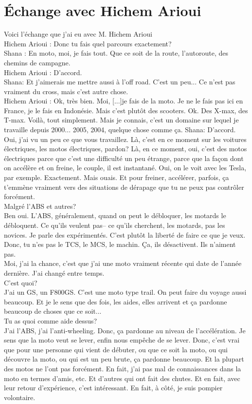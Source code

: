\section{Échange avec Hichem Arioui}
Voici l'échange que j'ai eu avec M. Hichem Arioui \\
Hichem Arioui : Donc tu fais quel parcours exactement? \\
Shana : En moto, moi, je fais tout. Que ce soit de la route, l'autoroute, des chemins de campagne.\\
Hichem Arioui : D'accord. \\
Shana: Et j'aimerais me mettre aussi à l'off road. C'est un peu... Ce n'est pas vraiment du cross, mais c'est autre chose. \\
Hichem Arioui : Ok, très bien. Moi, [...]je fais de la moto. Je ne le fais pas ici en France, je le fais en Indonésie. Mais c'est plutôt des scooters. Ok. Des X-max, des T-max. Voilà, tout simplement. Mais je connais, c'est un domaine sur lequel je travaille depuis 2000... 2005, 2004, quelque chose comme ça. 
Shana: D'accord. Oui, j'ai vu un peu ce que vous travaillez. Là, c'est en ce moment sur les voitures électriques, les motos électriques, pardon? Là, en ce moment, oui, c'est des motos électriques parce que c'est une difficulté un peu étrange, parce que la façon dont on accélère et on freine, le couple, il est instantané. Oui, on le voit avec les Tesla, par exemple. Exactement. Mais ouais. Et pour freiner, accélérer, parfois, ça t'emmène vraiment vers des situations de dérapage que tu ne peux pas contrôler forcément. \\
Malgré l'ABS et autres? \\
Ben oui. L'ABS, généralement, quand on peut le débloquer, les motards le débloquent. Ce qu'ils veulent pas-- ce qu'ils cherchent, les motards, pas les novices. Je parle des expérimentés. C'est plutôt la liberté de faire ce que je veux. Donc, tu n'es pas le TCS, le MCS, le machin. Ça, ils désactivent. Ils n'aiment pas. \\
Moi, j'ai la chance, c'est que j'ai une moto vraiment récente qui date de l'année dernière. J'ai changé entre temps. \\
C'est quoi? \\
J'ai un GS, un F800GS. C'est une moto type trail. On peut faire du voyage aussi beaucoup. Et je le sens que des fois, les aides, elles arrivent et ça pardonne beaucoup de choses que ce soit... \\
Tu as quoi comme aide dessus? \\
J'ai l'ABS, j'ai l'anti-wheeling. Donc, ça pardonne au niveau de l'accélération. Je sens que la moto veut se lever, enfin nous empêche de se lever. Donc, c'est vrai que pour une personne qui vient de débuter, ou que ce soit la moto, ou qui découvre la moto, ou qui est un peu brute, ça pardonne beaucoup. Et la plupart des motos ne l'ont pas forcément. En fait, j'ai pas mal de connaissances dans la moto en termes d'amis, etc. Et d'autres qui ont fait des chutes. Et en fait, avec leur retour d'expérience, c'est intéressant. En fait, à côté, je suis pompier volontaire. \\

